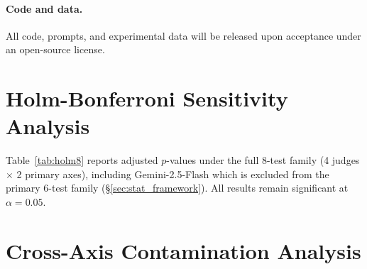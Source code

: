 \paragraph{Code and data.}
All code, prompts, and experimental data will be released upon acceptance under an open-source license.

\section{Holm-Bonferroni Sensitivity Analysis}
\label{app:holm8}

Table~\ref{tab:holm8} reports adjusted $p$-values under the full 8-test family (4 judges $\times$ 2 primary axes), including Gemini-2.5-Flash which is excluded from the primary 6-test family (\S\ref{sec:stat_framework}).
All results remain significant at $\alpha = 0.05$.

\begin{table}[h]
\centering
\small
\caption{Holm-Bonferroni sensitivity analysis: 8-test family (4 judges $\times$ 2 primary axes). All results remain significant under the expanded family ($\alpha = 0.05$).}
\label{tab:holm8}
\end{table}

\section{Cross-Axis Contamination Analysis}
\label{app:cross_axis_contamination}

